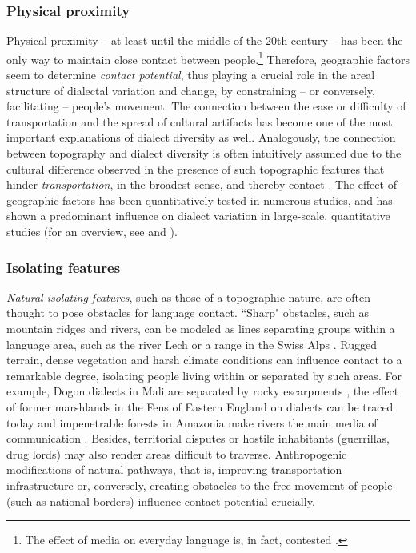 \documentclass[output=paper]{langscibook}
\begin{document}
\subsubsection{Physical proximity}

Physical proximity -- at least until the middle of the 20th century -- has been the only way to maintain close contact between people.\footnote{The effect of media on everyday language is, in fact, contested \parencite[cf., e.g.,][]{Trudgill2014}.}   Therefore, geographic factors seem to determine \textit{contact potential}, thus playing a crucial role in the areal structure of dialectal variation and change, by constraining -- or conversely, facilitating -- people's movement.
The connection between the ease or difficulty of transportation and the spread of cultural artifacts  \parencite[cf.][]{Hagerstrand1952} has become one of the most important explanations of dialect diversity as well. 
Analogously, the connection between topography and dialect diversity is often intuitively assumed due to the cultural difference observed in the presence of such topographic features that hinder \textit{transportation}, in the broadest sense, and thereby contact \parencite[][5]{Nichols2013}.
The effect of geographic factors has been quantitatively tested in numerous studies, and has shown a predominant influence on dialect variation in large-scale, quantitative studies (for an overview, see \cite[][253--255]{Wieling2015} and \cite[][24--26]{Jeszenszkythesis}).

\subsubsection{Isolating features}

\textit{Natural isolating features}, such as those of a topographic nature, are often thought to pose obstacles for language contact. “Sharp" obstacles, such as mountain ridges and rivers, can be modeled as lines separating groups within a language area, such as the river Lech \parencite[][29-33]{Pickl2014} or a range in the Swiss Alps \parencite[][]{Jeszenszky2017}. Rugged terrain, dense vegetation and harsh climate conditions can influence contact to a remarkable degree, isolating people living within or separated by such areas. For example, Dogon dialects in Mali are separated by rocky escarpments \parencite[][]{Moran2013}, the effect of former marshlands in the Fens of Eastern England on dialects can be traced today \parencite[][218]{Britain2010a} and impenetrable forests in Amazonia make rivers the main media of communication \parencite[][]{Ranacheretal2017identifying}. 
Besides, territorial disputes or hostile inhabitants (guerrillas, drug lords) may also render areas difficult to traverse. Anthropogenic modifications of natural pathways, that is, improving transportation infrastructure or, conversely, creating obstacles to the free movement of people (such as national borders) influence contact potential crucially. 
\end{document}
